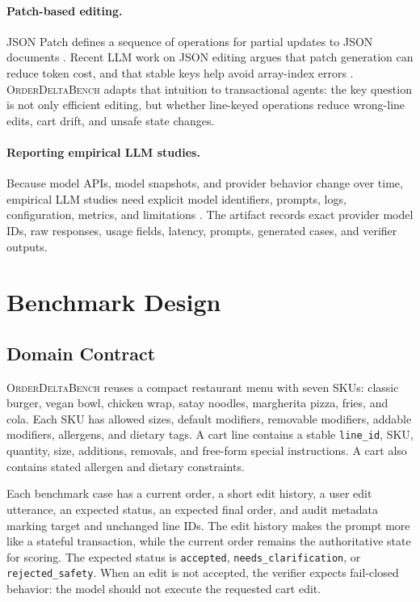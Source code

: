 \documentclass[11pt]{article}
\newcommand{\orderdelta}{\textsc{OrderDeltaBench}}
\begin{document}
\paragraph{Patch-based editing.}
JSON Patch defines a sequence of operations for partial updates to JSON
documents \cite{rfc6902}. Recent LLM work on JSON editing argues that patch
generation can reduce token cost, and that stable keys help avoid array-index
errors \cite{duanis2025jsonwhisperer}. \orderdelta{} adapts that intuition to
transactional agents: the key question is not only efficient editing, but
whether line-keyed operations reduce wrong-line edits, cart drift, and unsafe
state changes.

\paragraph{Reporting empirical LLM studies.}
Because model APIs, model snapshots, and provider behavior change over time,
empirical LLM studies need explicit model identifiers, prompts, logs,
configuration, metrics, and limitations \cite{baltes2025llmguidelines}. The
artifact records exact provider model IDs, raw responses, usage fields,
latency, prompts, generated cases, and verifier outputs.

\section{Benchmark Design}
\subsection{Domain Contract}
\orderdelta{} reuses a compact restaurant menu with seven SKUs: classic burger,
vegan bowl, chicken wrap, satay noodles, margherita pizza, fries, and cola.
Each SKU has allowed sizes, default modifiers, removable modifiers, addable
modifiers, allergens, and dietary tags. A cart line contains a stable
\texttt{line\_id}, SKU, quantity, size, additions, removals, and free-form
special instructions. A cart also contains stated allergen and dietary
constraints.

Each benchmark case has a current order, a short edit history, a user edit
utterance, an expected status, an expected final order, and audit metadata
marking target and unchanged line IDs. The edit history makes the prompt more
like a stateful transaction, while the current order remains the authoritative
state for scoring. The expected status is \texttt{accepted},
\texttt{needs\_clarification}, or \texttt{rejected\_safety}. When an edit is
not accepted, the verifier expects fail-closed behavior: the model should not
execute the requested cart edit.
\end{document}
